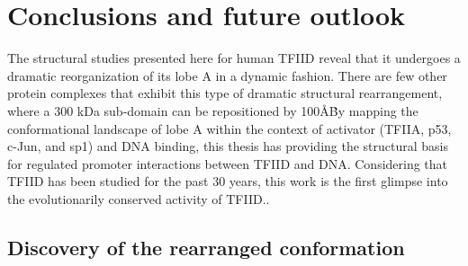 \chapter{Conclusions and future outlook}

The structural studies presented here for human TFIID reveal that it undergoes a dramatic reorganization of its lobe A in a dynamic fashion. There are few other protein complexes that exhibit this type of dramatic structural rearrangement, where a 300 kDa sub-domain can be repositioned by 100\AA\. By mapping the conformational landscape of lobe A within the context of activator (TFIIA, p53, c-Jun, and sp1) and DNA binding, this thesis has providing the structural basis for regulated promoter interactions between TFIID and DNA. Considering that TFIID has been studied for the past 30 years, this work is the first glimpse into the evolutionarily conserved activity of TFIID.. \\     

\section{Discovery of the rearranged conformation}

